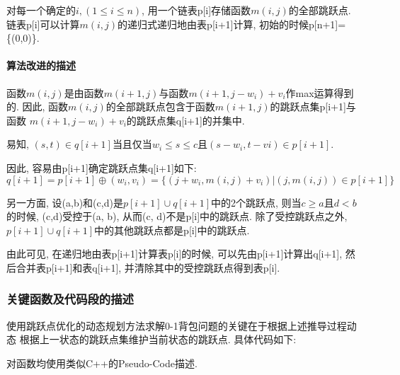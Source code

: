 对每一个确定的$i,(1\leq i\leq n)$, 用一个链表p[i]存储函数$m(i,j)$的全部跳跃点.
链表p[i]可以计算$m(i,j)$的递归式递归地由表p[i+1]计算,
初始的时候p[n+1]=\{(0,0)\}.

\paragraph{算法改进的描述}
函数$m(i,j)$是由函数$m(i+1,j)$与函数$m(i+1, j-w_i)+v_i$作max运算得到的. 因此,
函数$m(i,j)$的全部跳跃点包含于函数$m(i+1,j)$的跳跃点集p[i+1]与函数
$m(i+1,j-w_i)+v_i$的跳跃点集q[i+1]的并集中.\par

易知, $(s,t)\in q[i+1]$当且仅当$w_i\leq s\leq c$且$(s-w_i,t-v{i})\in p[i+1]$. \par

因此, 容易由p[i+1]确定跳跃点集q[i+1]如下:
\begin{equation}
	q[i+1]=p[i+1]\oplus (w_i,v_i)=\{(j+w_i,m(i,j)+v_i)|(j,m(i,j))\in p[i+1]\}
	\label{eq:jumpSet}
\end{equation}

另一方面, 设(a,b)和(c,d)是$p[i+1]\cup q[i+1]$中的2个跳跃点, 则当$c\geq
	a$且$d<b$的时候, (c,d)受控于(a, b), 从而(c, d)不是p[i]中的跳跃点.
除了受控跳跃点之外, $p[i+1]\cup q[i+1]$中的其他跳跃点都是p[i]中的跳跃点.\par

由此可见, 在递归地由表p[i+1]计算表p[i]的时候, 可以先由p[i+1]计算出q[i+1],
然后合并表p[i+1]和表q[i+1], 并清除其中的受控跳跃点得到表p[i].

\subsubsection{关键函数及代码段的描述}
使用跳跃点优化的动态规划方法求解0-1背包问题的关键在于根据上述推导过程动态
根据上一状态的跳跃点集维护当前状态的跳跃点. 具体代码如下:\par
对函数均使用类似C++的Pseudo-Code描述.

